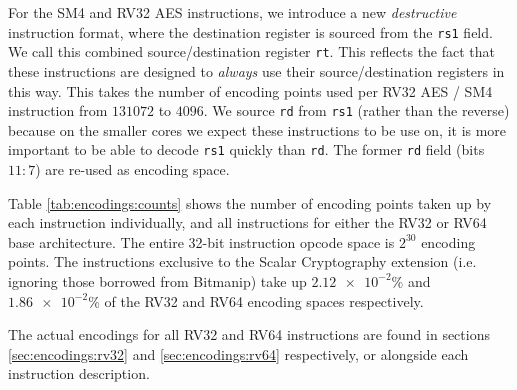 For the SM4 and RV32 AES instructions, we introduce a new {\em destructive}
instruction format, where the destination register is sourced from
the {\tt rs1} field.
We call this combined source/destination register {\tt rt}.
This reflects the fact that these instructions are designed to {\em always}
use their source/destination registers in this way.
This takes the number of encoding points used per RV32 AES / SM4 instruction
from $131072$ to $4096$.
We source {\tt rd} from {\tt rs1} (rather than the reverse) because on
the smaller cores we expect these instructions to be use on, it is
more important to be able to decode {\tt rs1} quickly than {\tt rd}.
The former {\tt rd} field (bits $11:7$) are re-used as encoding space.

Table \ref{tab:encodings:counts} shows the number of encoding points
taken up by each instruction individually, and all instructions for either
the RV32 or RV64 base architecture.
The entire 32-bit instruction opcode space is $2^{30}$ encoding points.
The instructions exclusive to the Scalar Cryptography extension
(i.e. ignoring those borrowed from Bitmanip)
take up $\num{2.12e-2}\%$
and     $\num{1.86e-2}\%$
of the RV32 and RV64 encoding spaces respectively.

The actual encodings for all RV32 and RV64 instructions are
found in sections
\ref{sec:encodings:rv32}
and
\ref{sec:encodings:rv64}
respectively, or alongside each instruction description.

